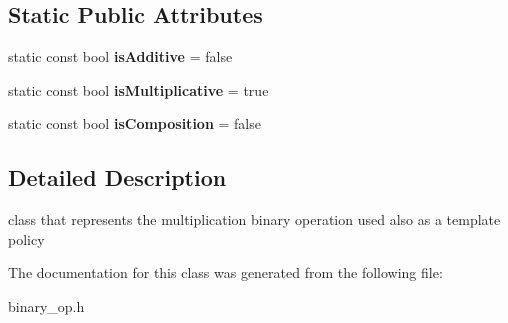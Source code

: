 \subsection*{Static Public Attributes}
\begin{DoxyCompactItemize}
\item 
\hypertarget{classMultiplication_a37f52c627c1caa3a1ba0388de58c5dbd}{static const bool {\bfseries is\-Additive} = false}\label{classMultiplication_a37f52c627c1caa3a1ba0388de58c5dbd}

\item 
\hypertarget{classMultiplication_aaf72f7c6c05f7ed984c8e997e0505d60}{static const bool {\bfseries is\-Multiplicative} = true}\label{classMultiplication_aaf72f7c6c05f7ed984c8e997e0505d60}

\item 
\hypertarget{classMultiplication_adbcbdd5feb18d22c1765fbe1b7829840}{static const bool {\bfseries is\-Composition} = false}\label{classMultiplication_adbcbdd5feb18d22c1765fbe1b7829840}

\end{DoxyCompactItemize}


\subsection{Detailed Description}
class that represents the multiplication binary operation used also as a template policy 

The documentation for this class was generated from the following file\-:\begin{DoxyCompactItemize}
\item 
binary\-\_\-op.\-h\end{DoxyCompactItemize}
